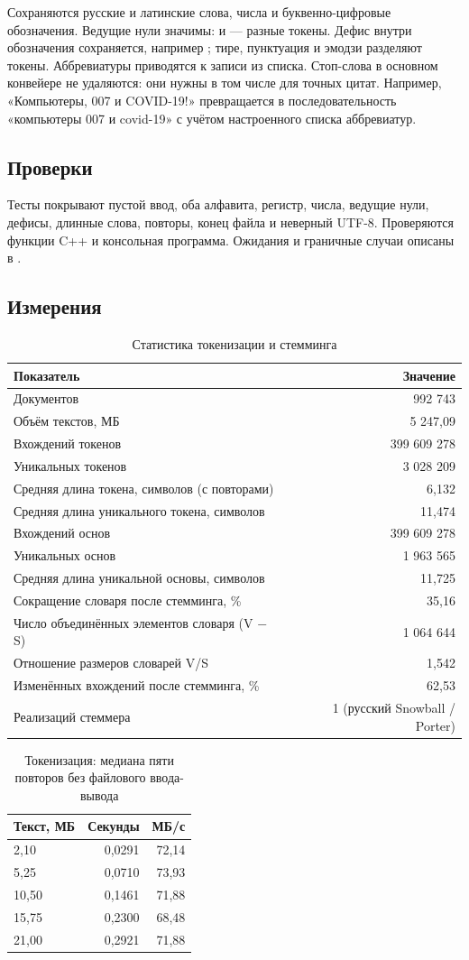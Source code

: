 \documentclass[12pt,a4paper]{article}
\newcommand{\code}[1]{\texttt{\detokenize{#1}}}
\newcommand{\sub}[1]{\subsection{#1}}
\begin{document}
Сохраняются русские и латинские слова, числа и буквенно-цифровые обозначения. Ведущие нули значимы: \code{007} и \code{7} --- разные токены. Дефис внутри обозначения сохраняется, например \code{COVID-19}; тире, пунктуация и эмодзи разделяют токены. Аббревиатуры приводятся к записи из списка. Стоп-слова в основном конвейере не удаляются: они нужны в том числе для точных цитат. Например, «Компьютеры, 007 и COVID-19!» превращается в последовательность «компьютеры 007 и covid-19» с учётом настроенного списка аббревиатур.
\sub{Проверки}
Тесты покрывают пустой ввод, оба алфавита, регистр, числа, ведущие нули, дефисы, длинные слова, повторы, конец файла и неверный UTF-8. Проверяются функции C++ и консольная программа. Ожидания и граничные случаи описаны в \code{tests_lr3_4/TEST_PLAN.md}.
\sub{Измерения}

\begin{table}[H]\centering\small
\caption{Статистика токенизации и стемминга}
\begin{tabularx}{\linewidth}{|X|r|}\hline
Показатель & Значение \\\hline
Документов & 992 743 \\\hline
Объём текстов, МБ & 5 247,09 \\\hline
Вхождений токенов & 399 609 278 \\\hline
Уникальных токенов & 3 028 209 \\\hline
Средняя длина токена, символов (с повторами) & 6,132 \\\hline
Средняя длина уникального токена, символов & 11,474 \\\hline
Вхождений основ & 399 609 278 \\\hline
Уникальных основ & 1 963 565 \\\hline
Средняя длина уникальной основы, символов & 11,725 \\\hline
Сокращение словаря после стемминга, \% & 35,16 \\\hline
Число объединённых элементов словаря (V − S) & 1 064 644 \\\hline
Отношение размеров словарей V/S & 1,542 \\\hline
Изменённых вхождений после стемминга, \% & 62,53 \\\hline
Реализаций стеммера & 1 (русский Snowball / Porter) \\\hline
\end{tabularx}\end{table}

\begin{table}[H]\centering\small
\caption{Токенизация: медиана пяти повторов без файлового ввода-вывода}
\begin{tabularx}{\linewidth}{|X|r|r|}\hline
Текст, МБ & Секунды & МБ/с \\\hline
2,10 & 0,0291 & 72,14 \\\hline
5,25 & 0,0710 & 73,93 \\\hline
10,50 & 0,1461 & 71,88 \\\hline
15,75 & 0,2300 & 68,48 \\\hline
21,00 & 0,2921 & 71,88 \\\hline
\end{tabularx}\end{table}
\end{document}
